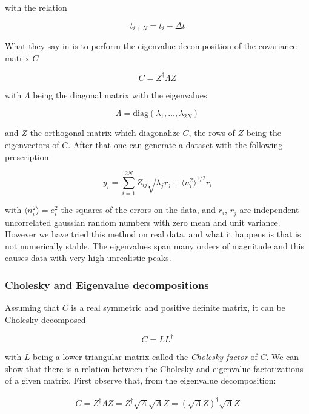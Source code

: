 with the relation

\begin{equation}
t_{i+N} = t_i - \Delta t
\end{equation}

What they say in \cite{Press1992} is to perform the eigenvalue decomposition of the covariance matrix $C$

\begin{equation}\label{eq:eigen-cov-decomp}
C = Z^\dagger \Lambda Z
\end{equation}

with $\Lambda$ being the diagonal matrix with the eigenvalues

\[
\Lambda = \mathrm{diag} \left ( \lambda_1, \dots, \lambda_{2N} \right )
\]
 
 and $Z$ the orthogonal matrix which diagonalize $C$, the rows of $Z$ being the eigenvectors of $C$. After that one can generate a dataset with the following prescription
 
\begin{equation}
y_i = \sum_{i=1}^{2N} Z_{ij} \sqrt{\lambda_j} r_j + \langle n_i^2 \rangle^{1/2} r_i
\end{equation}

with $ \langle n_i^2 \rangle = e_i^2$ the squares of the errors on the data, and $r_i$, $r_j$ are independent uncorrelated gaussian random numbers with zero mean and unit variance. However we have tried this method on real data, and what it happens is that is not numerically stable. The eigenvalues span many orders of magnitude and this causes data with very high unrealistic peaks.

\subsubsection{Cholesky and Eigenvalue decompositions}

Assuming that $C$ is a real symmetric and positive definite matrix, it can be Cholesky decomposed

\begin{equation}
C = L L^{\dagger}
\end{equation}

with $L$ being a lower triangular matrix called the \emph{Cholesky factor} of $C$. We can show that there is a relation between the Cholesky and eigenvalue factorizations of a given matrix. First observe that, from the eigenvalue decomposition:

\begin{align*}
C = Z^\dagger \Lambda Z = Z^\dagger \sqrt{\Lambda} \sqrt{\Lambda} Z = \left ( \sqrt{\Lambda} Z \right )^{\dagger} \sqrt{\Lambda} Z
\end{align*}

